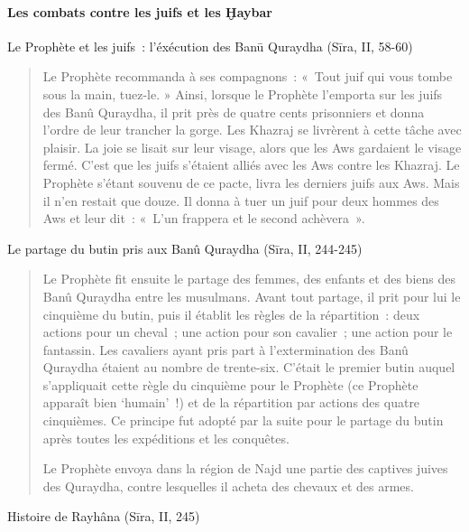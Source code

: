\paragraph{Les combats contre les juifs et les
Ḫaybar
}

Le Prophète et les juifs~: l'éxécution des Banū Quraydha (Sīra, II,
58-60)
\begin{quote}

{Le Prophète recommanda à ses compagnons~: «~Tout juif qui vous
tombe sous la main, tuez-le. » Ainsi, lorsque le Prophète l'emporta sur
les juifs des Banû Quraydha, il prit près de quatre cents prisonniers et
donna l'ordre de leur trancher la gorge. Les Khazraj se livrèrent à
cette tâche avec plaisir. La joie se lisait sur leur visage, alors que
les Aws gardaient le visage fermé. C'est que les juifs s'étaient alliés
avec les Aws contre les Khazraj. Le Prophète s'étant souvenu de ce
pacte, livra les derniers juifs aux Aws. Mais il n'en restait que douze.
Il donna à tuer un juif pour deux hommes des Aws et leur dit~: «~L'un
frappera et le second achèvera~».}
    
\end{quote}
Le partage du butin pris aux Banû Quraydha (Sīra, II, 244-245)
\begin{quote}

{Le Prophète fit ensuite le partage des femmes, des enfants et des
biens des Banû Quraydha entre les musulmans. Avant tout partage, il prit
pour lui le cinquième du butin, puis il établit les règles de la
répartition~: deux actions pour un cheval~; une action pour son
cavalier~; une action pour le fantassin. Les cavaliers ayant pris part à
l'extermination des Banû Quraydha étaient au nombre de trente-six.
C'était le premier butin auquel s'appliquait cette règle du cinquième
pour le Prophète (ce Prophète apparaît bien `humain'~!) et de la
répartition par actions des quatre cinquièmes. Ce principe fut adopté
par la suite pour le partage du butin après toutes les expéditions et
les conquêtes.}

{Le Prophète envoya dans la région de Najd une partie des captives
juives des Quraydha, contre lesquelles il acheta des chevaux et des
armes.}
    
\end{quote}
Histoire de Rayhâna (Sīra, II, 245)
